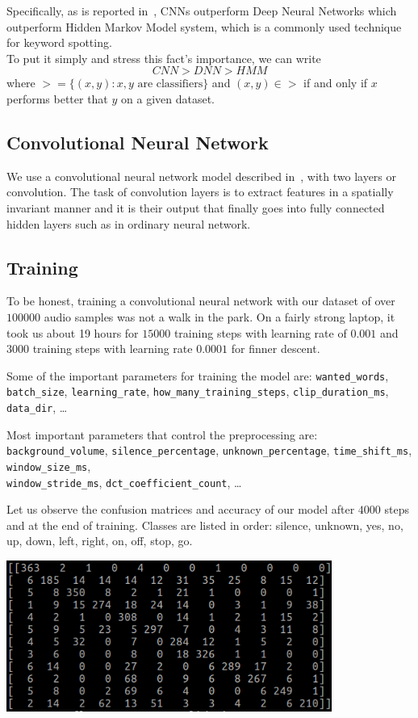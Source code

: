 \documentclass[twoside]{article}
\newcommand{\code}[1]{\texttt{#1}}
\newenvironment{Figure}
  {\par\medskip\noindent\minipage{\linewidth}}
  {\endminipage\par\medskip}
\begin{document}
\begin{multicols}{2}
Specifically, as is reported in~\cite{our-conv}, CNNs outperform Deep Neural Networks which outperform Hidden Markov Model system, which is a commonly used technique for keyword spotting.\\
To put it simply and stress this fact's importance, we can write
\[ CNN > DNN > HMM \]
where $> = \{(x,y): x,y \text{ are classifiers}\}$ and $(x,y) \in >$ if and only if $x$ performs better that $y$ on a given dataset.

\subsection{Convolutional Neural Network}
We use a convolutional neural network model described in~\cite{our-conv}, with two layers or convolution. The task of convolution layers is to extract features in a spatially invariant manner and it is their output that finally goes into fully connected hidden layers such as in ordinary neural network.

\subsection{Training}
To be honest, training a convolutional neural network with our dataset of over $100000$ audio samples was not a walk in the park. On a fairly strong laptop, it took us about 19 hours for $15000$ training steps with learning rate of $0.001$ and $3000$ training steps with learning rate $0.0001$ for finner descent.

Some of the important parameters for training the model are: \code{wanted\_words}, \code{batch\_size}, \code{learning\_rate}, \code{how\_many\_training\_steps}, \code{clip\_duration\_ms}, \code{data\_dir}, \ldots

Most important parameters that control the preprocessing are: \code{background\_volume}, \code{silence\_percentage}, \code{unknown\_percentage}, \code{time\_shift\_ms}, \code{window\_size\_ms},\\ \code{window\_stride\_ms}, \code{dct\_coefficient\_count}, \ldots

Let us observe the confusion matrices and accuracy of our model after $4000$ steps and at the end of training. Classes are listed in order: silence, unknown, yes, no, up, down, left, right, on, off, stop, go.

\begin{Figure}
	\centering
	\includegraphics[width=0.8\textwidth]{train_4000}
	\label{img:tr-4000}
\end{Figure}


\end{multicols}
\end{document}
